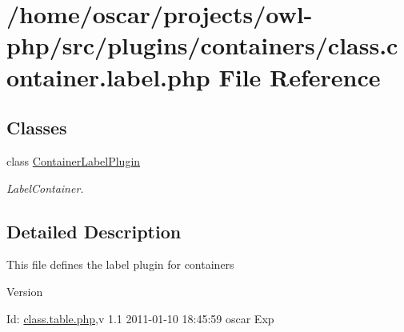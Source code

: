 \section{/home/oscar/projects/owl-\/php/src/plugins/containers/class.container.label.php File Reference}
\label{class_8container_8label_8php}
\subsection*{Classes}
\begin{DoxyCompactItemize}
\item 
class \hyperlink{classContainerLabelPlugin}{ContainerLabelPlugin}
\begin{DoxyCompactList}\small\item\em LabelContainer. \item\end{DoxyCompactList}\end{DoxyCompactItemize}


\subsection{Detailed Description}
This file defines the label plugin for containers \begin{DoxyVersion}{Version}

\end{DoxyVersion}
\begin{DoxyParagraph}{Id:}
\hyperlink{class_8table_8php}{class.table.php},v 1.1 2011-\/01-\/10 18:45:59 oscar Exp 
\end{DoxyParagraph}

